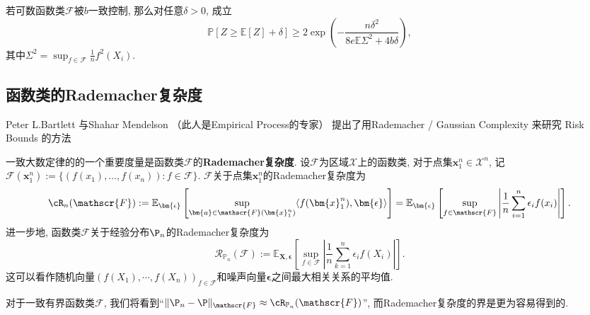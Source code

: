 \begin{theorem}[经验过程的Talagrand集中度]
	若可数函数类$\mathscr{F}$被$b$一致控制, 那么对任意$\delta > 0$, 成立
	\begin{equation*}
		\mathbb{P}[ Z \geq \mathbb{E}[Z] + \delta] 
		\geq 2 \exp \left( - \frac{n \delta^2}{8 e \mathbb{E} \Sigma^2 + 4 b \delta} \right), 
	\end{equation*}
	其中$\Sigma^2 = \sup_{f \in \mathscr{F}} \frac1n f^2(X_i)$. 
\end{theorem}


\subsection{函数类的Rademacher复杂度}

Peter L.Bartlett 与Shahar Mendelson （此人是Empirical Process的专家） 提出了用Rademacher / Gaussian Complexity 来研究 Risk Bounds 的方法


一致大数定律的的一个重要度量是函数类$\mathscr{F}$的\textbf{Rademacher复杂度}. 
设$\mathscr{F}$为区域$\mathcal{X}$上的函数类, 对于点集$\bm{x}_1^n \in \mathcal{X}^n$, 记$\mathscr{F}(\bm{x}_1^n) := \{(f(x_1), \dots, f(x_n)) \colon f \in \mathscr{F}\}$. 
$\mathscr{F}$关于点集$\bm{x}_1^n$的Rademacher复杂度为
\begin{equation*}
	\cR_n(\mathscr{F}) 
	:= \mathbb{E}_{\bm{\epsilon}} \left[ \sup_{\bm{a} \in \mathscr{F}(\bm{x}_1^n)} \langle f(\bm{x}_1^n), \bm{\epsilon} \rangle  \right]
	= \mathbb{E}_{\bm{\epsilon}} \left[ \sup_{f \in \mathscr{F}} \left| \frac{1}{n} \sum_{i=1}^n \epsilon_i f(x_i) \right| \right]. 
\end{equation*}
进一步地, 函数类$\mathscr{F}$关于经验分布$\P_n$的Rademacher复杂度为
\begin{equation*}
	\mathcal{R}_{\mathbb{P}_n}(\mathscr{F})
	:= \mathbb{E}_{\bm{X}, \bm{\epsilon}} \left[ \sup_{f \in \mathscr{F}} \left| \frac{1}{n} \sum_{k=1}^n \epsilon_i f(X_i) \right| \right]. 
\end{equation*}
这可以看作随机向量$(f(X_1), \cdots, f(X_n))_{f \in \mathscr{F}}$和噪声向量$\bm{\epsilon}$之间最大相关关系的平均值. 



对于一致有界函数类$\mathscr{F}$, 我们将看到“$\|\P_n - \P\|_{\mathscr{F}} \approx \cR_{\mathbb{P}_n}(\mathscr{F})$”, 而Rademacher复杂度的界是更为容易得到的. 

